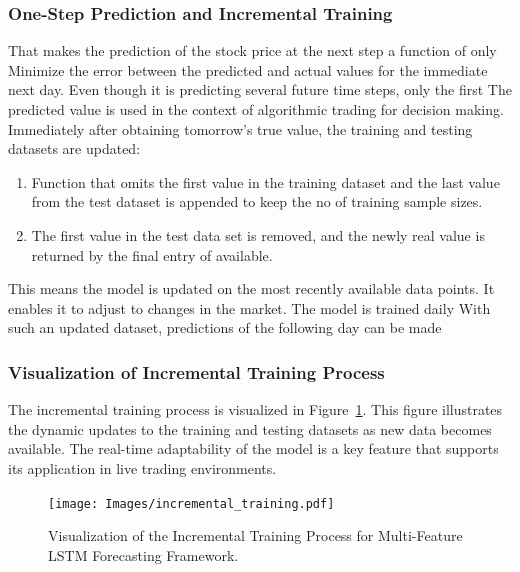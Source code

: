 \subsubsection{One-Step Prediction and Incremental Training}
That makes the prediction of the stock price at the next step a function of only
Minimize the error between the predicted and actual values for the immediate next day. Even though it is predicting several future time steps, only the first
The predicted value is used in the context of algorithmic trading for decision making.
Immediately after obtaining tomorrow's true value, the training and testing datasets
are updated:
\begin{enumerate}
    \item Function that omits the first value in the training dataset and the last value from the test dataset is appended to keep the no of training sample sizes.
    \item The first value in the test data set is removed, and the newly
real value is returned by the final entry of available.
\end{enumerate}

This means the model is updated on the most recently available data points.
It enables it to adjust to changes in the market. The model is trained daily
With such an updated dataset, predictions of the following day can be made

\subsubsection{Visualization of Incremental Training Process}
The incremental training process is visualized in Figure~\ref{fig:incremental_training}. This figure illustrates the dynamic updates to the training and testing datasets as new data becomes available. The real-time adaptability of the model is a key feature that supports its application in live trading environments.

\begin{figure}[h!]
    \centering
    \texttt{[image: Images/incremental\_training.pdf]}
    \caption{Visualization of the Incremental Training Process for Multi-Feature LSTM Forecasting Framework.}
    \label{fig:incremental_training}
\end{figure}


